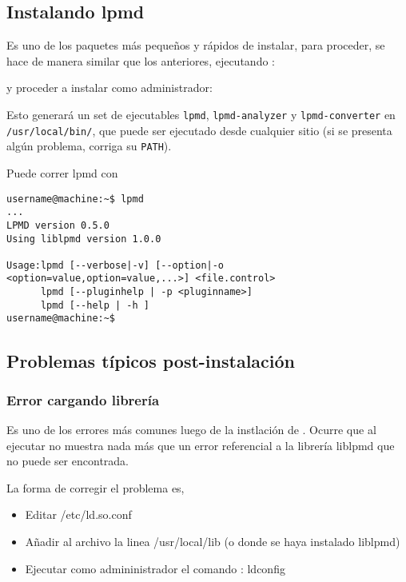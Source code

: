 \subsection{Instalando lpmd}

Es uno de los paquetes m\'as peque\~nos y r\'apidos de instalar, para proceder, se hace de manera similar que los anteriores, ejecutando :


y proceder a instalar como administrador:


Esto generar\'a un set de ejecutables \verb|lpmd|, \verb|lpmd-analyzer| y \verb|lpmd-converter| en \verb|/usr/local/bin/|, que puede ser ejecutado desde cualquier sitio (si se presenta alg\'un problema, corriga su \verb|PATH|).

Puede correr lpmd con

\begin{verbatim}
username@machine:~$ lpmd
...
LPMD version 0.5.0
Using liblpmd version 1.0.0

Usage:lpmd [--verbose|-v] [--option|-o <option=value,option=value,...>] <file.control>
      lpmd [--pluginhelp | -p <pluginname>]
      lpmd [--help | -h ]
username@machine:~$
\end{verbatim}

\subsection{Problemas t\'ipicos post-instalaci\'on}

\subsubsection{Error cargando librer\'ia}

Es uno de los errores m\'as comunes luego de la instlaci\'on de \lpmd. Ocurre que al ejecutar \lpmd no muestra nada m\'as que un error referencial a la librer\'ia liblpmd que no puede ser encontrada.

La forma de corregir el problema es,

\begin{itemize}
 \item Editar /etc/ld.so.conf
 \item A\~nadir al archivo la linea /usr/local/lib (o donde se haya instalado liblpmd)
 \item Ejecutar como admininistrador el comando : ldconfig
\end{itemize}

